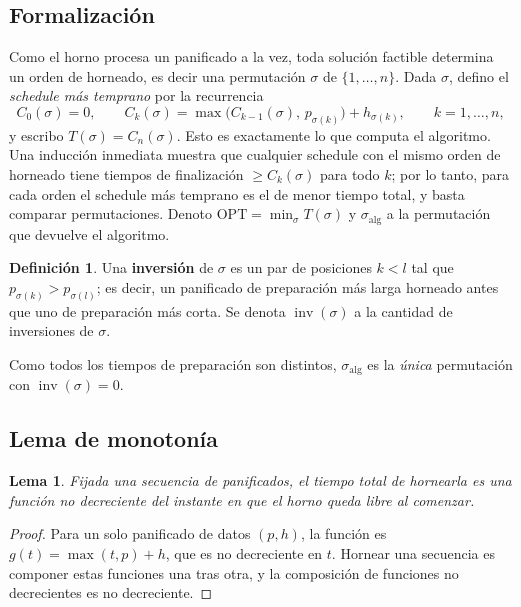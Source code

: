 \documentclass[11pt,a4paper]{article}
\theoremstyle{plain}
\newtheorem{lema}{Lema}
\theoremstyle{definition}
\newtheorem{definicion}{Definición}
\theoremstyle{remark}
\newcommand{\inv}{\operatorname{inv}}
\begin{document}
\subsection*{Formalización}

Como el horno procesa un panificado a la vez, toda solución factible determina
un orden de horneado, es decir una permutación $\sigma$ de $\{1,\dots,n\}$.
Dada $\sigma$, defino el \emph{schedule más temprano} por la recurrencia
\[
  C_0(\sigma) = 0, \qquad
  C_k(\sigma) = \max\bigl( C_{k-1}(\sigma),\, p_{\sigma(k)} \bigr) + h_{\sigma(k)},
  \qquad k = 1,\dots,n,
\]
y escribo $T(\sigma) = C_n(\sigma)$. Esto es exactamente lo que computa el
algoritmo. Una inducción inmediata muestra que cualquier schedule con el mismo
orden de horneado tiene tiempos de finalización $\geq C_k(\sigma)$ para todo
$k$; por lo tanto, para cada orden el schedule más temprano es el de menor
tiempo total, y basta comparar permutaciones. Denoto
$\mathrm{OPT} = \min_\sigma T(\sigma)$ y $\sigma_{\mathrm{alg}}$ a la
permutación que devuelve el algoritmo.

\begin{definicion}
Una \textbf{inversión} de $\sigma$ es un par de posiciones $k < l$ tal que
$p_{\sigma(k)} > p_{\sigma(l)}$; es decir, un panificado de preparación más
larga horneado antes que uno de preparación más corta. Se denota $\inv(\sigma)$
a la cantidad de inversiones de $\sigma$.
\end{definicion}

Como todos los tiempos de preparación son distintos, $\sigma_{\mathrm{alg}}$ es
la \emph{única} permutación con $\inv(\sigma) = 0$.

\subsection*{Lema de monotonía}

\begin{lema}\label{lema:mono}
Fijada una secuencia de panificados, el tiempo total de hornearla es una función
no decreciente del instante en que el horno queda libre al comenzar.
\end{lema}

\begin{proof}
Para un solo panificado de datos $(p,h)$, la función es
$g(t) = \max(t,p) + h$, que es no decreciente en $t$. Hornear una secuencia es
componer estas funciones una tras otra, y la composición de funciones no
decrecientes es no decreciente.
\end{proof}
\end{document}
